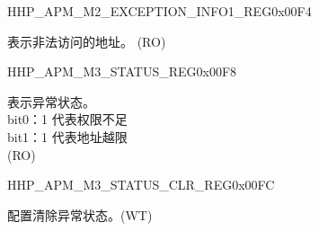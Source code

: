 \begin{register}{H}{HP\_APM\_M2\_EXCEPTION\_INFO1\_REG}{0x00F4}\label{regdesc:HPAPMM2EXCEPTIONINFO1REG}
%
\regnewline%
\begin{regdesc}\begin{reglist}
\label{fielddesc:HPAPMM2EXCEPTIONADDR}\item [HP\_APM\_M2\_EXCEPTION\_ADDR] 表示非法访问的地址。 (RO)
\end{reglist}\end{regdesc}
\end{register}


\begin{register}{H}{HP\_APM\_M3\_STATUS\_REG}{0x00F8}\label{regdesc:HPAPMM3STATUSREG}
%
%
\regnewline%
\begin{regdesc}\begin{reglist}
\label{fielddesc:HPAPMM3EXCEPTIONSTATUS}\item [HP\_APM\_M3\_EXCEPTION\_STATUS] 表示异常状态。 \\
    bit0：1 代表权限不足 \\
    bit1：1 代表地址越限  \\ (RO)
\end{reglist}\end{regdesc}
\end{register}


\begin{register}{H}{HP\_APM\_M3\_STATUS\_CLR\_REG}{0x00FC}\label{regdesc:HPAPMM3STATUSCLRREG}
%
%
\regnewline%
\begin{regdesc}\begin{reglist}
\label{fielddesc:HPAPMM3EXCEPTIONSTATUSCLR}\item [HP\_APM\_M3\_EXCEPTION\_STATUS\_CLR] 配置清除异常状态。(WT)
\end{reglist}\end{regdesc}
\end{register}


